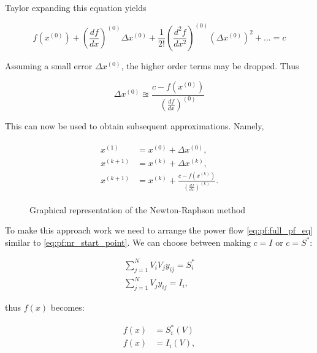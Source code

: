 Taylor expanding this equation yields

\begin{equation}
    f(x^{(0)}) + (\frac{df}{dx})^{(0)} \Delta x^{(0)} + \frac{1}{2!} (\frac{d^2f}{dx^2})^{(0)} (\Delta x^{(0)})^2 + ... = c
\end{equation}

Assuming a small error $\Delta x^{(0)}$, the higher order terms may be dropped. Thus

\begin{equation}
    \Delta x^{(0)} \approxeq \frac{c - f(x^{(0)}) }{ (\frac{df}{dx})^{(0)} }
\end{equation}

This can now be used to obtain subsequent approximations. Namely,

\begin{align}
    \begin{split}
    x^{(1)}   &= x^{(0)} + \Delta x^{(0)},\\
    x^{(k+1)} &= x^{(k)} + \Delta x^{(k)},\\
    x^{(k+1)} &= x^{(k)} + \frac{c - f(x^{(k)}) }{ (\frac{df}{dx})^{(k)} }.
    \end{split}
    \label{eq:pf:nr_iteration}
\end{align}

\begin{figure}[H]
    \centering
    
    \caption{
       Graphical representation of the Newton-Raphson method
    }
    \label{fig:pf:nr_graph}
\end{figure}

To make this approach work we need to arrange the power flow \autoref{eq:pf:full_pf_eq}
similar to \autoref{eq:pf:nr_start_point}. We can choose between making $c = I$ or 
$c = S^*$:

\begin{equation}
    \begin{split}
        \sum_{j = 1}^N V_i V_j y_{ij} = S^*_i\\
        \sum_{j = 1}^N V_j y_{ij} = I_i,
    \end{split}
    \label{eq:pf:nr_pf_starting_point}
\end{equation}

thus $f(x)$ becomes:

\begin{equation}
    \begin{split}
        f(x) &= S^*_i(V)\\
        f(x) &= I_i(V),
    \end{split}
    \label{eq:pf:nr:fx_def}
\end{equation}

